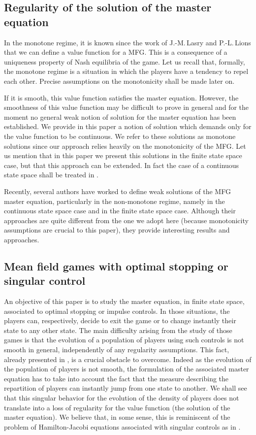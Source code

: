 \documentclass[JEP,XML,SOM,Unicode,NoEqCountersInSection,published]{cedram}
\theoremstyle{definition}
\begin{document}
\subsection*{Regularity of the solution of the master equation}
In the monotone regime, it is known since the work of J.-M.\,Lasry and P.-L.\,Lions that we can define a value function for a MFG. This is a consequence of a uniqueness property of Nash equilibria of the game. Let us recall that, formally, the monotone regime is a situation in which the players have a tendency to repel each other. Precise assumptions on the monotonicity shall be made later on.

If it is smooth, this value function satisfies the master equation. However, the smoothness of this value function may be difficult to prove in general \cite{cardaliaguet2019master} and for the moment no general weak notion of solution for the master equation has been established. We provide in this paper a notion of solution which demands only for the value function to be continuous. We refer to these solutions as monotone solutions since our approach relies heavily on the monotonicity of the MFG. Let us mention that in this paper we present this solutions in the finite state space case, but that this approach can be extended. In fact the case of a continuous state space shall be treated in \cite{bertucci2020forthcomming}.

Recently, several authors have worked to define weak solutions of the MFG master equation, particularly in the non-monotone regime, namely \cite{mou,gangbo,zhang} in the continuous state space case and \cite{cecchin2019convergence} in the finite state space case. Although their approaches are quite different from the one we adopt here (because monotonicity assumptions are crucial to this paper), they provide interesting results and approaches.

\subsection*{Mean field games with optimal stopping or singular control}
An objective of this paper is to study the master equation, in finite state space, associated to optimal stopping or impulse controls. In those situations, the players can, respectively, decide to exit the game or to change instantly their state to any other state. The main difficulty arising from the study of those games is that the evolution of a population of players using such controls is not smooth in general, independently of any regularity assumptions. This fact, already presented in \cite{bertucci2018optimal,bertucci2020fokker}, is a crucial obstacle to overcome. Indeed as the evolution of the population of players is not smooth, the formulation of the associated master equation has to take into account the fact that the measure describing the repartition of players can instantly jump from one state to another. We shall see that this singular behavior for the evolution of the density of players does not translate into a loss of regularity for the value function (\ie the solution of the master equation). We believe that, in some sense, this is reminiscent of the problem of Hamilton-Jacobi equations associated with singular controls as in \cite{lasry2000classe}.
\end{document}
